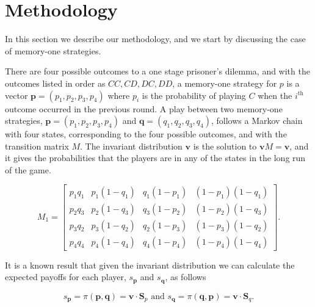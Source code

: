 \documentclass{article}
\theoremstyle{definition}
\begin{document}
\section{Methodology}\label{section:methodology}

In this section we describe our methodology, and we start by discussing
the case of memory-one strategies.

There are four possible outcomes to a one stage prisoner's dilemma, and with the
outcomes listed in order as \(CC, CD, DC, DD\), a memory-one strategy for \(p\)
is a vector \(\mathbf{p} = (p_1, p_2, p_3, p_4)\) where \(p_i\) is the
probability of playing \(C\) when the \(i^{\text{th}}\) outcome occurred in the
previous round. A play between two memory-one strategies, \(\mathbf{p} = (p_1,
p_2, p_3, p_4)\) and \(\mathbf{q} = (q_1, q_2, q_3, q_4)\), follows a Markov
chain with four states, corresponding to the four possible outcomes, and with
the transition matrix \(M\). The invariant distribution \(\mathbf{v}\) is the
solution to \(\mathbf{v} M = \mathbf{v}\), and it gives the probabilities that
the players are in any of the states in the long run of the game.

\begin{equation}
\displaystyle M_1 = \left[\begin{matrix}p_{1} q_{1} & p_{1} \left(1 - q_{1}\right) & q_{1} \left(1 - p_{1}\right) & \left(1 - p_{1}\right) \left(1 - q_{1}\right)\\
  p_{2} q_{3} & p_{2} \left(1 - q_{3}\right) & q_{3} \left(1 - p_{2}\right) & \left(1 - p_{2}\right) \left(1 - q_{3}\right)\\
  p_{3} q_{2} & p_{3} \left(1 - q_{2}\right) & q_{2} \left(1 - p_{3}\right) & \left(1 - p_{3}\right) \left(1 - q_{2}\right)\\
  p_{4} q_{4} & p_{4} \left(1 - q_{4}\right) & q_{4} \left(1 - p_{4}\right) & \left(1 - p_{4}\right) \left(1 - q_{4}\right)\end{matrix}\right].
\end{equation}

It is a known result that given the invariant distribution we can calculate the expected payoffs for
each player, \(s_{\mathbf{p}}\) and \(s_{\mathbf{q}}\), as follows

\begin{equation*}
  s_{\mathbf{p}} = \pi(\mathbf{p}, \mathbf{q}) = \mathbf{v} \cdot \mathbf{S}_{p} \text{ and } s_{\mathbf{q}} = \pi(\mathbf{q}, \mathbf{p}) = \mathbf{v} \cdot \mathbf{S}_{q}.
\end{equation*}
\end{document}

